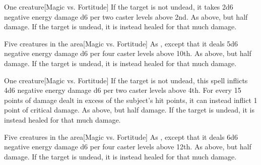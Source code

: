 \spellrng{\rngclose}
\begin{spelltarget}{One creature}[Magic vs. Fortitude]
    \spellsuccess If the target is not undead, it takes 2d6 negative energy damage \add d6 per two caster levels above 2nd.
    \spellfailure As above, but half damage.
    \spelleffect If the target is undead, it is instead healed for that much damage.
\end{spelltarget}

\begin{spelltargets}{Five creatures in the area}[Magic vs. Fortitude]
    \spellsuccess As , except that it deals 5d6 negative energy damage \add d6 per four caster levels above 10th.
    \spellfailure As above, but half damage.
    \spelleffect If the target is undead, it is instead healed for that much damage.
\end{spelltargets}

\begin{spelltarget}{One creature}[Magic vs. Fortitude]
    \spellsuccess If the target is not undead, this spell inflicts 4d6 negative energy damage \add d6 per two caster levels above 4th. For every 15 points of damage dealt in excess of the subject's hit points, it can instead inflict 1 point of critical damage.
    \spellfailure As above, but half damage.
    \spelleffect If the target is undead, it is instead healed for that much damage.
\end{spelltarget}

\begin{spelltargets}{Five creatures in the area}[Magic vs. Fortitude]
    \spellsuccess As , except that it deals 6d6 negative energy damage \add d6 per four caster levels above 12th.
    \spellfailure As above, but half damage.
    \spelleffect If the target is undead, it is instead healed for that much damage.
\end{spelltargets}

